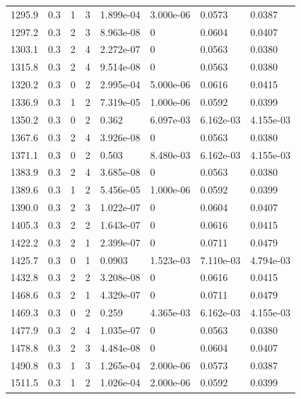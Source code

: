 \documentclass[preview]{standalone}
\begin{document}
{{{{\begin{tabular}{L{1.2cm}C{1.2cm} C{0.3cm}C{0.5cm} C{1.4cm}C{1.4cm} C{1.4cm}C{1.4cm}}
  1295.9  &   0.3  & 1     &  3 &  1.899e-04  & 3.000e-06  & 0.0573 &  0.0387   \\ 
  1297.2  &   0.3  & 2     &  3 &  8.963e-08  & 0  & 0.0604 &  0.0407   \\ 
  1303.1  &   0.3  & 2     &  4 &  2.272e-07  & 0  & 0.0563 &  0.0380   \\ 
  1315.8  &   0.3  & 2     &  4 &  9.514e-08  & 0  & 0.0563 &  0.0380   \\ 
  1320.2  &   0.3  & 0     &  2 &  2.995e-04  & 5.000e-06  & 0.0616 &  0.0415   \\ 
  1336.9  &   0.3  & 1     &  2 &  7.319e-05  & 1.000e-06  & 0.0592 &  0.0399   \\ 
  1350.2  &   0.3  & 0     &  2 &  0.362  & 6.097e-03  & 6.162e-03 &  4.155e-03   \\ 
  1367.6  &   0.3  & 2     &  4 &  3.926e-08  & 0  & 0.0563 &  0.0380   \\ 
  1371.1  &   0.3  & 0     &  2 &  0.503  & 8.480e-03  & 6.162e-03 &  4.155e-03   \\ 
  1383.9  &   0.3  & 2     &  4 &  3.685e-08  & 0  & 0.0563 &  0.0380   \\ 
  1389.6  &   0.3  & 1     &  2 &  5.456e-05  & 1.000e-06  & 0.0592 &  0.0399   \\ 
  1390.0  &   0.3  & 2     &  3 &  1.022e-07  & 0  & 0.0604 &  0.0407   \\ 
  1405.3  &   0.3  & 2     &  2 &  1.643e-07  & 0  & 0.0616 &  0.0415   \\ 
  1422.2  &   0.3  & 2     &  1 &  2.399e-07  & 0  & 0.0711 &  0.0479   \\ 
  1425.7  &   0.3  & 0     &  1 &  0.0903  & 1.523e-03  & 7.110e-03 &  4.794e-03   \\ 
  1432.8  &   0.3  & 2     &  2 &  3.208e-08  & 0  & 0.0616 &  0.0415   \\ 
  1468.6  &   0.3  & 2     &  1 &  4.329e-07  & 0  & 0.0711 &  0.0479   \\ 
  1469.3  &   0.3  & 0     &  2 &  0.259  & 4.365e-03  & 6.162e-03 &  4.155e-03   \\ 
  1477.9  &   0.3  & 2     &  4 &  1.035e-07  & 0  & 0.0563 &  0.0380   \\ 
  1478.8  &   0.3  & 2     &  3 &  4.484e-08  & 0  & 0.0604 &  0.0407   \\ 
  1490.8  &   0.3  & 1     &  3 &  1.265e-04  & 2.000e-06  & 0.0573 &  0.0387   \\ 
  1511.5  &   0.3  & 1     &  2 &  1.026e-04  & 2.000e-06  & 0.0592 &  0.0399   \\ 

\end{tabular}}}}}
\end{document}
